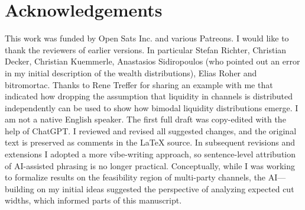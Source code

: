 \documentclass[10pt,twocolumn]{article}
\begin{document}
\section{Acknowledgements}
This work was funded by Open Sats Inc. and various Patreons. I would like to thank the reviewers of earlier versions. In particular Stefan Richter, Christian Decker, Christian Kuemmerle, Anastasios Sidiropoulos (who pointed out an error in my initial description of the wealth distributions), Elias Roher and bitromortac. Thanks to Rene Treffer for sharing an example with me that indicated how dropping the assumption that liquidity in channels is distributed independently can be used to show how bimodal liquidity distributions emerge.
I am not a native English speaker. The first full draft was copy-edited with the help of ChatGPT. I reviewed and revised all suggested changes, and the original text is preserved as comments in the LaTeX source. In subsequent revisions and extensions I adopted a more vibe-writing approach, so sentence-level attribution of AI-assisted phrasing is no longer practical. Conceptually, while I was working to formalize results on the feasibility region of multi-party channels, the AI—building on my initial ideas suggested the perspective of analyzing expected cut widths, which informed parts of this manuscript.

\end{document}
